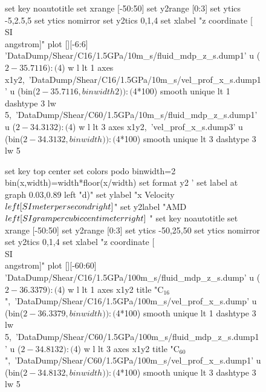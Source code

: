 \documentclass[5p]{elsarticle}
\begin{document}
\begin{figure}[htp]
\begin{center}
\begin{gnuplot}[terminal=epslatex, terminaloptions={size \SERFigwidth cm, \SERFigheight cm color solid}]
			set key noautotitle
			set xrange [-50:50]
			set y2range [0:3]
			set ytics  -5,2.5,5
			set ytics nomirror
			set y2tics 0,1,4
			set xlabel "z coordinate [\\SI{}{\\angstrom}]"  
			plot  	[][-6:6]  'DataDump/Shear/C16/1.5GPa/10m_s/fluid_mdp_z_s.dump1' u ($2-35.7116):($4) w l  lt 1 axes x1y2,\
				              'DataDump/Shear/C16/1.5GPa/10m_s/vel_prof_x_s.dump1'  u (bin($2-35.7116,binwidth2)):($4*100) smooth unique lt 1 dashtype 3  lw 5,\
                             		   'DataDump/Shear/C60/1.5GPa/10m_s/fluid_mdp_z_s.dump1' u ($2-34.3132):($4) w l  lt 3  axes x1y2,\
				              'vel_prof_x_s.dump3'  u (bin($2-34.3132,binwidth)):($4*100) smooth unique lt 3 dashtype 3  lw 5		
		\end{gnuplot}
		\begin{gnuplot}[terminal=epslatex, terminaloptions={size \SERFigwidth cm, \SERFigheight cm color solid}]
		set key top center
			set colors podo
			binwidth=2
			bin(x,width)=width*floor(x/width)
			set format y2 '%
			set label at graph 0.03,0.89 left "d)"
			set ylabel "x Velocity $\\left[ \\SI{}{\\meter\\per\\second} \\right]$"
			set y2label "AMD $\\left[ \\SI{}{\\gram\\per\\cubic\\centi\\meter} \\right]$ "
			set key noautotitle
			set xrange [-50:50]
			set y2range [0:3]
			set ytics  -50,25,50
			set ytics nomirror
			set y2tics 0,1,4
			set xlabel "z coordinate [\\SI{}{\\angstrom}]"  
			plot  	[][-60:60]  'DataDump/Shear/C16/1.5GPa/100m_s/fluid_mdp_z_s.dump' u ($2-36.3379):($4) w l  lt 1 axes x1y2 title "C$_{16}$",\
				              'DataDump/Shear/C16/1.5GPa/100m_s/vel_prof_x_s.dump'  u (bin($2-36.3379,binwidth)):($4*100) smooth unique lt 1 dashtype 3  lw 5,\
                             		     'DataDump/Shear/C60/1.5GPa/100m_s/fluid_mdp_z_s.dump1' u ($2-34.8132):($4) w l  lt 3  axes x1y2 title "C$_{60}$",\
				              'DataDump/Shear/C60/1.5GPa/100m_s/vel_prof_x_s.dump1'  u (bin($2-34.8132,binwidth)):($4*100) smooth unique lt 3 dashtype 3  lw 5 	
		\end{gnuplot}
		

\end{center}
\end{figure}
\end{document}
